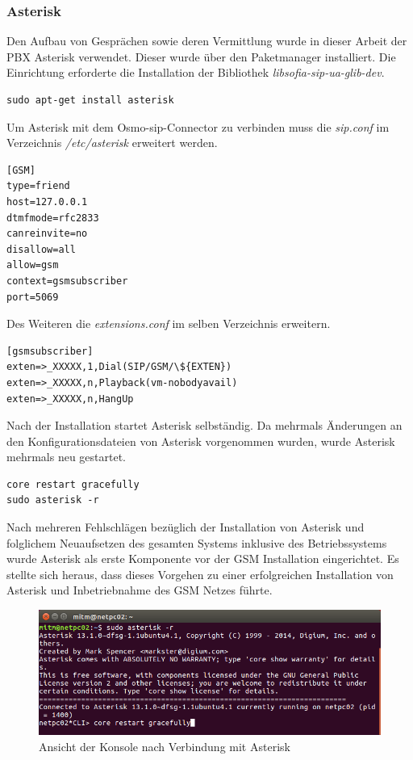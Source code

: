 \subsubsection{Asterisk}
Den Aufbau von Gesprächen sowie deren Vermittlung wurde in dieser Arbeit der PBX Asterisk verwendet. Dieser wurde über den Paketmanager installiert. Die Einrichtung erforderte die Installation der Bibliothek \textit{libsofia-sip-ua-glib-dev}.

\begin{lstlisting}
sudo apt-get install asterisk
\end{lstlisting}

Um Asterisk mit dem Osmo-sip-Connector zu verbinden muss die \textit{sip.conf} im Verzeichnis \textit{/etc/asterisk} erweitert werden.

\begin{lstlisting}
[GSM]
type=friend
host=127.0.0.1
dtmfmode=rfc2833
canreinvite=no
disallow=all
allow=gsm
context=gsmsubscriber
port=5069
\end{lstlisting}

Des Weiteren die \textit{extensions.conf} im selben Verzeichnis erweitern.
\begin{lstlisting}
[gsmsubscriber]
exten=>_XXXXX,1,Dial(SIP/GSM/\${EXTEN})
exten=>_XXXXX,n,Playback(vm-nobodyavail)
exten=>_XXXXX,n,HangUp
\end{lstlisting}

Nach der Installation startet Asterisk selbständig. Da mehrmals Änderungen an den Konfigurationsdateien von Asterisk vorgenommen wurden, wurde Asterisk mehrmals neu gestartet.

\begin{lstlisting}
core restart gracefully
sudo asterisk -r
\end{lstlisting}

Nach mehreren Fehlschlägen bezüglich der Installation von Asterisk und folglichem Neuaufsetzen des gesamten Systems inklusive des Betriebssystems wurde Asterisk als erste Komponente vor der GSM Installation eingerichtet. Es stellte sich heraus, dass dieses Vorgehen zu einer erfolgreichen Installation von Asterisk und Inbetriebnahme des GSM Netzes führte.

\begin{figure}[h] %
\centering
\includegraphics[width=15cm]{includes/Asterisk}
\caption{Ansicht der Konsole nach Verbindung mit Asterisk}
\label{fig:Asterisk}
\end{figure}